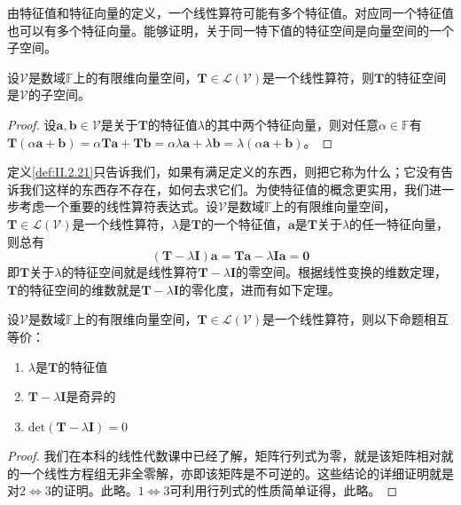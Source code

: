 \documentclass[main.tex]{subfiles}
\begin{document}
由特征值和特征向量的定义，一个线性算符可能有多个特征值。对应同一个特征值也可以有多个特征向量。能够证明，关于同一特下值的特征空间是向量空间的一个子空间。

\begin{theorem}\label{thm:II.2.26}
    设$\mathcal{V}$是数域$\mathbb{F}$上的有限维向量空间，$\mathbf{T}\in\mathcal{L}\left(\mathcal{V}\right)$是一个线性算符，则$\mathbf{T}$的特征空间是$\mathcal{V}$的子空间。
\end{theorem}
\begin{proof}
    设$\mathbf{a},\mathbf{b}\in\mathcal{V}$是关于$\mathbf{T}$的特征值$\lambda$的其中两个特征向量，则对任意$\alpha\in\mathbb{F}$有$\mathbf{T}\left(\alpha\mathbf{a}+\mathbf{b}\right)=\alpha\mathbf{Ta}+\mathbf{Tb}=\alpha\lambda\mathbf{a}+\lambda\mathbf{b}=\lambda\left(\alpha\mathbf{a}+\mathbf{b}\right)$。
\end{proof}

定义\ref{def:II.2.21}只告诉我们，如果有满足定义的东西，则把它称为什么；它没有告诉我们这样的东西存不存在，如何去求它们。为使特征值的概念更实用，我们进一步考虑一个重要的线性算符表达式。设$\mathcal{V}$是数域$\mathbb{F}$上的有限维向量空间，$\mathbf{T}\in\mathcal{L}\left(\mathcal{V}\right)$是一个线性算符，$\lambda$是$\mathbf{T}$的一个特征值，$\mathbf{a}$是$\mathbf{T}$关于$\lambda$的任一特征向量，则总有
\[\left(\mathbf{T}-\lambda\mathbf{I}\right)\mathbf{a}=\mathbf{Ta}-\lambda\mathbf{Ia}=\mathbf{0}\]
即$\mathbf{T}$关于$\lambda$的特征空间就是线性算符$\mathbf{T}-\lambda\mathbf{I}$的零空间。根据线性变换的维数定理，$\mathbf{T}$的特征空间的维数就是$\mathbf{T}-\lambda\mathbf{I}$的零化度，进而有如下定理。

\begin{theorem}\label{thm:II.2.27}
    设$\mathcal{V}$是数域$\mathbb{F}$上的有限维向量空间，$\mathbf{T}\in\mathcal{L}\left(\mathcal{V}\right)$是一个线性算符，则以下命题相互等价：
    \begin{enumerate}
        \item $\lambda$是$\mathbf{T}$的特征值
        \item $\mathbf{T}-\lambda\mathbf{I}$是奇异的
        \item $\mathrm{det}\left(\mathbf{T}-\lambda\mathbf{I}\right)=0$
    \end{enumerate}
    \begin{proof}
        我们在本科的线性代数课中已经了解，矩阵行列式为零，就是该矩阵相对就的一个线性方程组无非全零解，亦即该矩阵是不可逆的。这些结论的详细证明就是对$2\Leftrightarrow 3$的证明。此略。$1\Leftrightarrow 3$可利用行列式的性质简单证得，此略。
    \end{proof}
\end{theorem}
\end{document}
